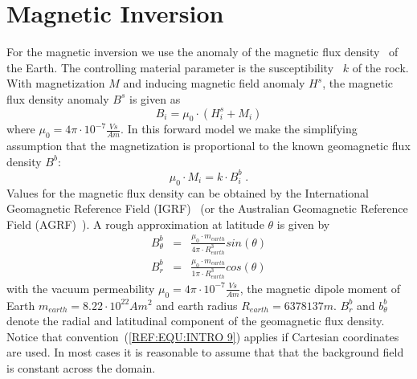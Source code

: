 
%
%
%


\section{Magnetic Inversion}\label{sec:forward magnetic}
For the magnetic inversion we use the anomaly of the magnetic flux
density~ of the Earth.
The controlling material parameter is the susceptibility~
$k$ of the rock.
With magnetization $M$ and inducing magnetic field anomaly $H^s$, the magnetic
flux density anomaly $B^s$ is given as
\begin{equation}\label{ref:MAG:EQU:1}
B_i = \mu_0 \cdot ( H^s_i  + M_i )
\end{equation}
where $\mu_0 = 4 \pi \cdot 10^{-7} \frac{Vs}{Am}$.
In this forward model we make the simplifying assumption that the magnetization
is proportional to the known geomagnetic flux density $B^b$:
\begin{equation}\label{ref:MAG:EQU:4}
\mu_0  \cdot M_i = k \cdot B^b_i \;. 
\end{equation}
Values for the magnetic flux density can be obtained by the International
Geomagnetic Reference Field (IGRF)~\cite{IGRF}
(or the Australian Geomagnetic Reference Field (AGRF)~\cite{AGRF}).
A rough approximation at latitude $\theta$ is given by 
\begin{equation}\label{ref:MAG:EQU:5}
\begin{array}{rcl}
B^b_{\theta}  & = & \displaystyle{ \frac{ \mu_0 \cdot m_{earth}}{4 \pi \cdot R_{earth}^3} sin(\theta) }  \\
B^b_r & = & \displaystyle{ \frac{\mu_0 \cdot  m_{earth}}{1 \pi \cdot R_{earth}^3} cos(\theta) }
\end{array}
\end{equation}
with the vacuum permeability $\mu_0 = 4 \pi \cdot 10^{-7} \frac{Vs}{Am}$,
the magnetic dipole moment of Earth $m_{earth}=8.22 \cdot 10^{22} Am^2$ and
earth radius $R_{earth}= 6378137m$.
$B^b_r$ and $b^b_{\theta}$ denote the radial and latitudinal component of the
geomagnetic flux density.
Notice that convention~(\ref{REF:EQU:INTRO 9}) applies if Cartesian
coordinates are used.
In most cases it is reasonable to assume that that the background field is
constant across the domain.

